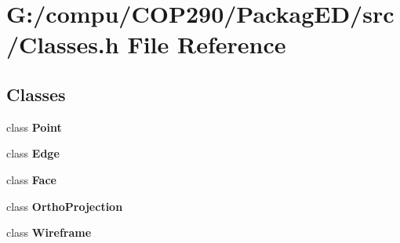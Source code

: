 \section{G\+:/compu/\+C\+O\+P290/\+Packag\+E\+D/src/\+Classes.h File Reference}
\label{src_2_classes_8h}
\subsection*{Classes}
\begin{DoxyCompactItemize}
\item 
class \textbf{ Point}
\item 
class \textbf{ Edge}
\item 
class \textbf{ Face}
\item 
class \textbf{ Ortho\+Projection}
\item 
class \textbf{ Wireframe}
\end{DoxyCompactItemize}
